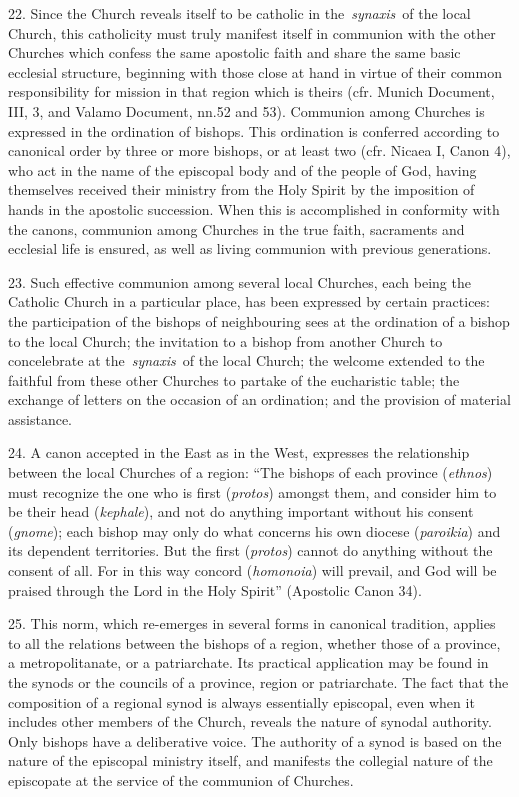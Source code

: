 22. Since the Church reveals itself to be catholic in
the~\emph{synaxis}~of the local Church, this catholicity must truly
manifest itself in communion with the other Churches which confess the
same apostolic faith and share the same basic ecclesial structure,
beginning with those close at hand in virtue of their common
responsibility for mission in that region which is theirs (cfr. Munich
Document, III, 3, and Valamo Document, nn.52 and 53). Communion among
Churches is expressed in the ordination of bishops. This ordination is
conferred according to canonical order by three or more bishops, or at
least two (cfr. Nicaea I, Canon 4), who act in the name of the episcopal
body and of the people of God, having themselves received their ministry
from the Holy Spirit by the imposition of hands in the apostolic
succession. When this is accomplished in conformity with the canons,
communion among Churches in the true faith, sacraments and ecclesial
life is ensured, as well as living communion with previous generations.

23. Such effective communion among several local Churches, each being
the Catholic Church in a particular place, has been expressed by certain
practices: the participation of the bishops of neighbouring sees at the
ordination of a bishop to the local Church; the invitation to a bishop
from another Church to concelebrate at the~\emph{synaxis}~of the local
Church; the welcome extended to the faithful from these other Churches
to partake of the eucharistic table; the exchange of letters on the
occasion of an ordination; and the provision of material assistance.

24. A canon accepted in the East as in the West, expresses the
relationship between the local Churches of a region: ``The bishops of
each province (\emph{ethnos}) must recognize the one who is first
(\emph{protos}) amongst them, and consider him to be their head
(\emph{kephale}), and not do anything important without his consent
(\emph{gnome}); each bishop may only do what concerns his own diocese
(\emph{paroikia}) and its dependent territories. But the first
(\emph{protos}) cannot do anything without the consent of all. For in
this way concord (\emph{homonoia}) will prevail, and God will be praised
through the Lord in the Holy Spirit'' (Apostolic Canon 34).

25. This norm, which re-emerges in several forms in canonical tradition,
applies to all the relations between the bishops of a region, whether
those of a province, a metropolitanate, or a patriarchate. Its practical
application may be found in the synods or the councils of a province,
region or patriarchate. The fact that the composition of a regional
synod is always essentially episcopal, even when it includes other
members of the Church, reveals the nature of synodal authority. Only
bishops have a deliberative voice. The authority of a synod is based on
the nature of the episcopal ministry itself, and manifests the collegial
nature of the episcopate at the service of the communion of Churches.

